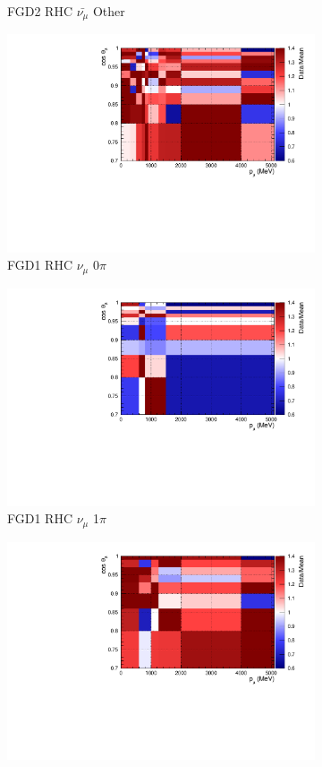 \begin{figure}
\begin{subfigure}{.32\textwidth}
  \caption{FGD2 RHC $\bar{\nu_{\mu}}$ Other}
  \label{fig:priorpred_FGD2_anti-numuCC_other}
\end{subfigure}
\begin{subfigure}{.32\textwidth}
  \centering
  \includegraphics[width=0.85\linewidth]{figs/priorpred_FGD1_NuMuBkg_CC0pi_in_AntiNu_Mode.pdf}
  \caption{FGD1 RHC $\nu_{\mu}$ 0$\pi$}
  \label{fig:priorpred_FGD1_NuMuBkg_CC0pi_in_AntiNu_Mode}
\end{subfigure}
\begin{subfigure}{.32\textwidth}
  \centering
  \includegraphics[width=0.85\linewidth]{figs/priorpred_FGD1_NuMuBkg_CC1pi_in_AntiNu_Mode.pdf}
  \caption{FGD1 RHC $\nu_{\mu}$ 1$\pi$}
  \label{fig:priorpred_FGD1_NuMuBkg_CC1pi_in_AntiNu_Mode}
\end{subfigure}
\begin{subfigure}{.32\textwidth}
  \centering
  \includegraphics[width=0.85\linewidth]{figs/priorpred_FGD1_NuMuBkg_CCOther_in_AntiNu_Mode.pdf}

\end{subfigure}
\end{figure}
